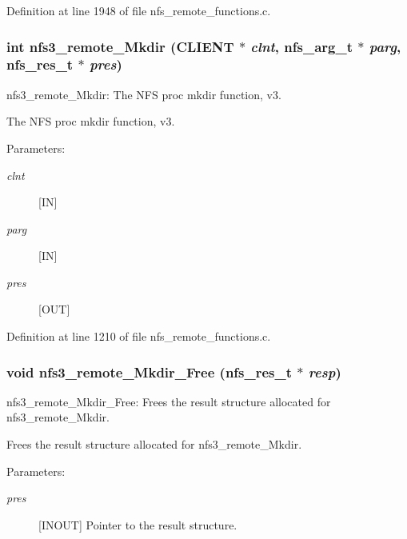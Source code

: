 Definition at line 1948 of file nfs\_\-remote\_\-functions.c.
\subsubsection[{nfs3\_\-remote\_\-Mkdir}]{\setlength{\rightskip}{0pt plus 5cm}int nfs3\_\-remote\_\-Mkdir (CLIENT $\ast$ {\em clnt}, \/  nfs\_\-arg\_\-t $\ast$ {\em parg}, \/  nfs\_\-res\_\-t $\ast$ {\em pres})}\label{group__NFSprocs_g087b36e270a15c89a9b8327448a774b9}


nfs3\_\-remote\_\-Mkdir: The NFS proc mkdir function, v3.

The NFS proc mkdir function, v3.

\begin{Desc}
\item[Parameters:]
\begin{description}
\item[{\em clnt}][IN] \item[{\em parg}][IN] \item[{\em pres}][OUT] \end{description}
\end{Desc}


Definition at line 1210 of file nfs\_\-remote\_\-functions.c.
\subsubsection[{nfs3\_\-remote\_\-Mkdir\_\-Free}]{\setlength{\rightskip}{0pt plus 5cm}void nfs3\_\-remote\_\-Mkdir\_\-Free (nfs\_\-res\_\-t $\ast$ {\em resp})}\label{group__NFSprocs_gba4b922b6e1007dc9bafff5271184dfa}


nfs3\_\-remote\_\-Mkdir\_\-Free: Frees the result structure allocated for nfs3\_\-remote\_\-Mkdir.

Frees the result structure allocated for nfs3\_\-remote\_\-Mkdir.

\begin{Desc}
\item[Parameters:]
\begin{description}
\item[{\em pres}][INOUT] Pointer to the result structure. \end{description}
\end{Desc}


